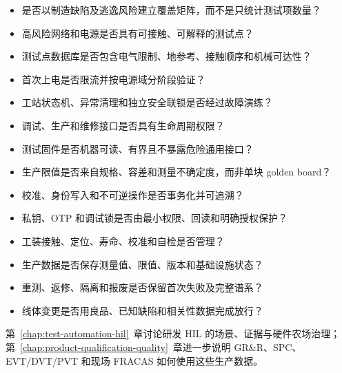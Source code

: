 \begin{itemize}
  \item 是否以制造缺陷及逃逸风险建立覆盖矩阵，而不是只统计测试项数量？
  \item 高风险网络和电源是否具有可接触、可解释的测试点？
  \item 测试点数据库是否包含电气限制、地参考、接触顺序和机械可达性？
  \item 首次上电是否限流并按电源域分阶段验证？
  \item 工站状态机、异常清理和独立安全联锁是否经过故障演练？
  \item 调试、生产和维修接口是否具有生命周期权限？
  \item 测试固件是否机器可读、有界且不暴露危险通用接口？
  \item 生产限值是否来自规格、容差和测量不确定度，而非单块 golden board？
  \item 校准、身份写入和不可逆操作是否事务化并可追溯？
  \item 私钥、OTP 和调试锁是否由最小权限、回读和明确授权保护？
  \item 工装接触、定位、寿命、校准和自检是否管理？
  \item 生产数据是否保存测量值、限值、版本和基础设施状态？
  \item 重测、返修、隔离和报废是否保留首次失败及完整谱系？
  \item 线体变更是否用良品、已知缺陷和相关性数据完成放行？
\end{itemize}

第~\ref{chap:test-automation-hil}~章讨论研发 HIL 的场景、证据与硬件农场治理；第~\ref{chap:product-qualification-quality}~章进一步说明 GR\&R、SPC、EVT/DVT/PVT 和现场 FRACAS 如何使用这些生产数据。
